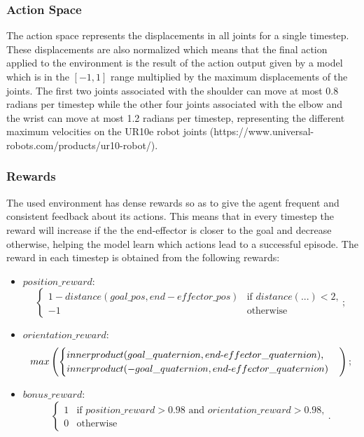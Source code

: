 \subsubsection{Action Space}

The action space represents the displacements in all joints for a single timestep. These displacements are also normalized which means that the final action applied to the environment is the result of the action output given by a model which is in the $[-1, 1]$ range multiplied by the maximum displacements of the joints. The first two joints associated with the shoulder can move at most 0.8 radians per timestep while the other four joints associated with the elbow and the wrist can move at most 1.2 radians per timestep, representing the different maximum velocities on the UR10e robot joints (https://www.universal-robots.com/products/ur10-robot/).

\subsubsection{Rewards}

The used environment has dense rewards so as to give the agent frequent and consistent feedback about its actions. This means that in every timestep the reward will increase if the the end-effector is closer to the goal and decrease otherwise, helping the model learn which actions lead to a successful episode. The reward in each timestep is obtained from the following rewards:

\begin{itemize}
    \item $position\_reward$: \[
            \begin{cases}
                1-distance(goal\_pos, end-effector\_pos) & \text{if $distance(...)<2$,}\\
                -1 & \text{otherwise}
            \end{cases};
        \]
    
    \item $orientation\_reward$: \[
            max\left(
            \begin{cases}
                innerproduct(goal\_quaternion, end$-$effector\_quaternion) \text{,}\\
                innerproduct(-goal\_quaternion, end$-$effector\_quaternion) 
            \end{cases}\right)\text{;}
        \]
    \item $bonus\_reward$: \[
            \begin{cases}
                1 & \text{if $position\_reward>0.98$ and $orientation\_reward>0.98$,}\\
                0 & \text{otherwise}
            \end{cases}\text{.}
        \]

\end{itemize}

